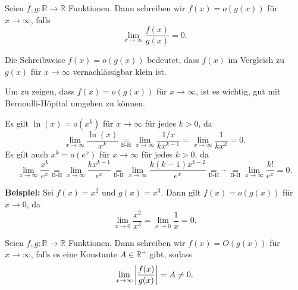 \documentclass[12pt]{article}
\newcommand{\BH}{\underset{\textrm{B-H}}{=}}
\newcommand{\R}{\mathbb{R}} %
\newenvironment{definition}[2][Definition]{\begin{trivlist}
        \item[\hskip \labelsep {\bfseries #1}\hskip \labelsep {\bfseries #2.}]}{\flushright{$\square$}\end{trivlist}}
\newenvironment{remark}[2][Bemerkung]{\begin{trivlist}
        \item[\hskip \labelsep {\bfseries #1}\hskip \labelsep {\bfseries #2.}]}{\end{trivlist}}
\begin{document}
\begin{definition}{[Landau-o]}
        Seien $f,g: \R\to\R$ Funktionen. Dann schreiben wir $f(x)=o(g(x))$ für $x\to \infty$, falls
        \begin{equation}
                \lim_{x\to \infty}\frac{f(x)}{g(x)}=0.
        \end{equation}

        \begin{remark}{[Intuition]}
                Die Schreibweise $f(x)=o(g(x))$ bedeutet, dass $f(x)$ im Vergleich zu $g(x)$ für $x\to \infty$ vernachlässigbar klein ist.
        \end{remark}
        \begin{remark}{[Berechnung]}
                Um zu zeigen, dass $f(x)=o(g(x))$ für $x\to \infty$, ist es wichtig, gut mit Bernoulli-Hôpital umgehen zu können.
        \end{remark}
        \begin{remark}{[$\ln$, $x^k$ und $e^x$]}
                Es gilt $\ln(x)=o(x^k)$ für $x\to\infty$ für jedes $k>0$, da
                \begin{equation}
                        \lim_{x\to\infty}\frac{\ln(x)}{x^k}\BH{}\lim_{x\to\infty}\frac{1/x}{kx^{k-1}}=\lim_{x\to\infty}\frac{1}{kx^k}=0.
                \end{equation}
                Es gilt auch $x^k=o(e^x)$ für $x\to\infty$ für jedes $k>0$, da
                \begin{equation}
                        \lim_{x\to\infty}\frac{x^k}{e^x}\BH{}\lim_{x\to\infty}\frac{kx^{k-1}}{e^x}\BH\lim_{x\to\infty}\frac{k(k-1)x^{k-2}}{e^x}\BH\cdots\BH\lim_{x\to\infty}\frac{k!}{e^x}=0.
                \end{equation}
        \end{remark}
        \textbf{Beispiel:} Sei $f(x)=x^2$ und $g(x)=x^3$. Dann gilt $f(x)=o(g(x))$ für $x\to 0$, da
        \begin{equation}
                \lim_{x\to 0}\frac{x^2}{x^3}=\lim_{x\to 0}\frac{1}{x}=0.
        \end{equation}
\end{definition}

\begin{definition}{[Landau-O]}
        Seien $f,g: \R\to\R$ Funktionen. Dann schreiben wir $f(x)=O(g(x))$ für $x\to \infty$, falls es eine Konstante $A\in\R^{+}$ gibt, sodass
        \begin{equation}
                \lim_{x\to \infty}\abs{\frac{f(x)}{g(x)}}=A\neq0.
        \end{equation}
\end{definition}
\end{document}
